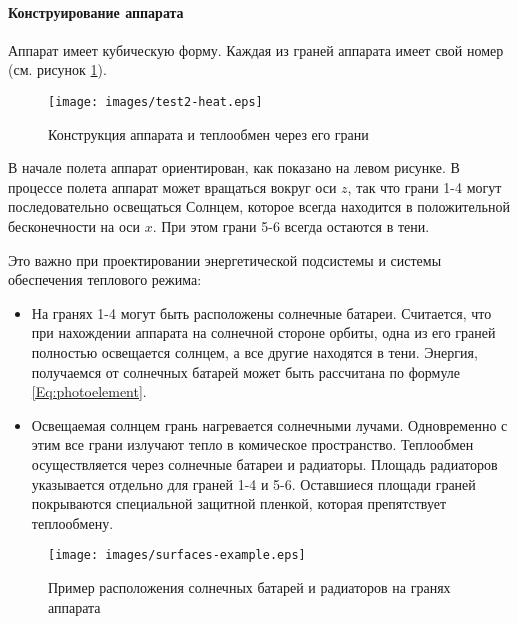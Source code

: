 \documentclass[12pt,a4paper]{article}
\begin{document}
\paragraph{Конструирование аппарата}

Аппарат имеет кубическую форму. Каждая из граней аппарата имеет свой номер (см. рисунок
\ref{Pic:test2-heat}).

\begin{figure}[tbh]
  \begin{center}
    \texttt{[image: images/test2-heat.eps]}
    \caption{Конструкция аппарата и теплообмен через его грани}
    \label{Pic:test2-heat}
  \end{center}
\end{figure}

В начале полета аппарат ориентирован, как показано на левом рисунке. В процессе полета
аппарат может вращаться вокруг оси $z$, так что грани 1-4 могут последовательно освещаться
Солнцем, которое всегда находится в положительной бесконечности на оси $x$. При этом грани
5-6 всегда остаются в тени.

Это важно при проектировании энергетической подсистемы и системы обеспечения теплового
режима:

\begin{itemize}
\item На гранях 1-4 могут быть расположены солнечные батареи. Считается, что при
  нахождении аппарата на солнечной стороне орбиты, одна из его граней полностью освещается
  солнцем, а все другие находятся в тени. Энергия, получаемся от солнечных батарей может
  быть рассчитана по формуле \ref{Eq:photoelement}.
\item Освещаемая солнцем грань нагревается солнечными лучами. Одновременно с этим все
  грани излучают тепло в комическое пространство. Теплообмен осуществляется через
  солнечные батареи и радиаторы. Площадь радиаторов указывается отдельно для граней 1-4 и
  5-6. Оставшиеся площади граней покрываются специальной защитной пленкой, которая
  препятствует теплообмену.
\end{itemize}

\begin{figure}[tbh]
  \begin{center}
    \texttt{[image: images/surfaces-example.eps]}
    \caption{Пример расположения солнечных батарей и радиаторов на гранях аппарата}
    \label{Pic:surfaces-example}
  \end{center}
\end{figure}
\end{document}
